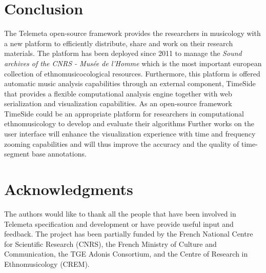 \documentclass{sig-alternate}
\begin{document}
\section{Conclusion}
The Telemeta open-source framework provides the researchers in musicology with a new platform to efficiently distribute, share and work on their research materials.
The platform has been deployed since 2011 to manage the \emph{Sound archives of the CNRS - Musée de l'Homme} which is the most important european collection of ethnomusicocological resources.
Furthermore, this platform is offered automatic music analysis capabilities through an external component, TimeSide that provides a flexible computational analysis engine together with web serialization and visualization capabilities. As an open-source framework TimeSide could be an appropriate platform for researchers in computational ethnomusicology to develop and evaluate their algorithms
Further works on the user interface will enhance the visualization experience with time and frequency zooming capabilities and will thus improve the accuracy and the quality of time-segment base annotations.
\section{Acknowledgments}
The authors would like to thank all the people that have been involved in Telemeta specification and development or have provide useful input and feedback. 
The project has been partially funded by the French National Centre for Scientific Research (CNRS), the French Ministry of Culture and Communication, the TGE Adonis Consortium, and the Centre of Research in Ethnomusicology (CREM).




\end{document}
